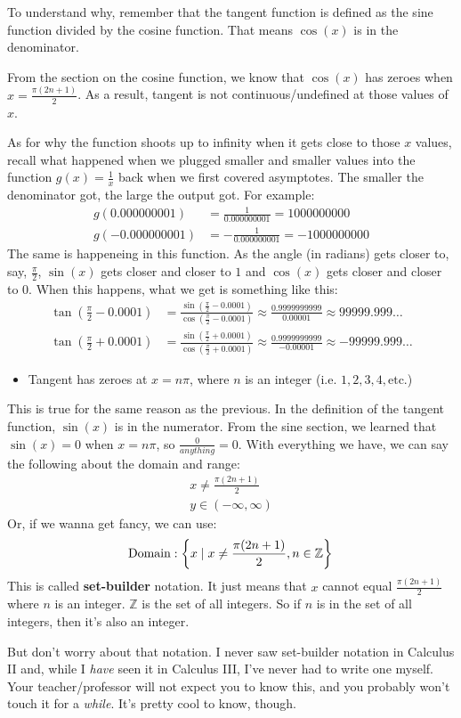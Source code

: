To understand why, remember that the tangent function is defined as the sine function divided by the cosine function. That means $\cos(x)$ is in the denominator.

From the section on the cosine function, we know that $\cos(x)$ has zeroes when $x = \frac{\pi(2n + 1)}{2}$. As a result, tangent is not continuous/undefined at those values of $x$.

As for why the function shoots up to infinity when it gets close to those $x$ values, recall what happened when we plugged smaller and smaller values into the function $g(x) = \frac{1}{x}$ back when we first covered asymptotes. The smaller the denominator got, the large the output got. For example:
\begin{align*}
    g(0.000000001) &= \frac{1}{0.000000001} = 1000000000 \\
    g(-0.000000001) &= -\frac{1}{0.000000001} = -1000000000
\end{align*}
The same is happeneing in this function. As the angle (in radians) gets closer to, say, $\frac{\pi}{2}$, $\sin(x)$ gets closer and closer to $1$ and $\cos(x)$ gets closer and closer to $0$. When this happens, what we get is something like this:
\begin{align*}
    \tan\left(\frac{\pi}{2} - 0.0001 \right) &= \frac{\sin\left(\frac{\pi}{2} - 0.0001 \right)}{\cos\left(\frac{\pi}{2} - 0.0001 \right)}
    \approx \frac{0.9999999999}{0.00001} \approx 99999.999\dots \\
    \tan\left(\frac{\pi}{2} + 0.0001 \right) &= \frac{\sin\left(\frac{\pi}{2} + 0.0001 \right)}{\cos\left(\frac{\pi}{2} + 0.0001 \right)}
    \approx \frac{0.9999999999}{-0.00001} \approx -99999.999\dots
\end{align*}
\begin{itemize}
    \item Tangent has zeroes at $x = n\pi$, where $n$ is an integer (i.e. $1,2,3,4,\text{etc.}$)
\end{itemize}
This is true for the same reason as the previous. In the definition of the tangent function, $\sin(x)$ is in the numerator. From the sine section, we learned that $\sin(x) = 0$ when $x = n\pi$, so $\frac{0}{anything} = 0$.
\clearpage
With everything we have, we can say the following about the domain and range:
\begin{align*}
    x \neq \frac{\pi(2n + 1)}{2} \\
    y \in (-\infty, \infty)
\end{align*}
Or, if we wanna get fancy, we can use:
\[
    \text{Domain}: \left\{ x \mid x \neq \frac{\pi(2n + 1)}{2}, n \in \mathbb{Z} \right\} \\
\]
This is called \textbf{set-builder} notation. It just means that $x$ cannot equal $\frac{\pi(2n + 1)}{2}$ where $n$ is an integer. $\mathbb{Z}$ is the set of all integers. So if $n$ is in the set of all integers, then it's also an integer. 

But don't worry about that notation. I never saw set-builder notation in Calculus II and, while I \textit{have} seen it in Calculus III, I've never had to write one myself. Your teacher/professor will not expect you to know this, and you probably won't touch it for a \textit{while}. It's pretty cool to know, though.
\clearpage